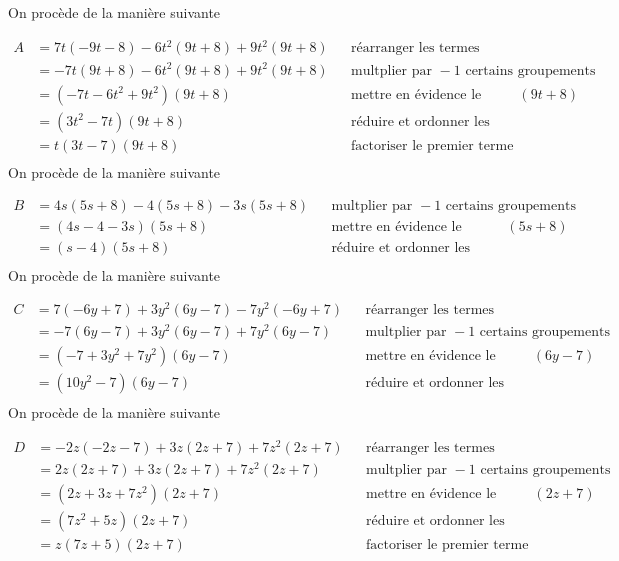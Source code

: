 \documentclass[a4paper,12pt]{report}
\begin{document}
\begin{core}\phantom{ }

\begin{tasks}
\task On procède de la manière suivante 

\medskip
 $\begin{aligned}A&=7 t(-9 t-8 )-6 t^2(9 t + 8 )+9 t^2(9 t + 8 )&&\text{réarranger les termes}\\&=-7 t(9 t + 8 )-6 t^2(9 t + 8 )+9 t^2(9 t + 8 )&&\text{multplier par } -1 \text{ certains groupements}\\&=(-7 t-6 t^2 + 9 t^2)(9 t + 8 )&& \text{mettre en évidence le facteur } (9 t + 8 )\\&=(3 t^2-7 t)(9 t + 8 ) && \text{réduire et ordonner les facteurs}\\&={{t(3 t-7 )(9 t + 8 )}}&& \text{factoriser le premier terme}\\\end{aligned}$
\task On procède de la manière suivante 

\medskip
 $\begin{aligned}B&=4 s(5 s + 8 )-4 (5 s + 8 )-3 s(5 s + 8 )&&\text{multplier par } -1 \text{ certains groupements}\\&=(4 s-4 -3 s)(5 s + 8 )&& \text{mettre en évidence le facteur } (5 s + 8 )\\&={{(s-4 )(5 s + 8 )}}&& \text{réduire et ordonner les facteurs}\\\end{aligned}$
\task On procède de la manière suivante 

\medskip
 $\begin{aligned}C&=7 (-6 y + 7 )+3 y^2(6 y-7 )-7 y^2(-6 y + 7 )&&\text{réarranger les termes}\\&=-7 (6 y-7 )+3 y^2(6 y-7 )+7 y^2(6 y-7 )&&\text{multplier par } -1 \text{ certains groupements}\\&=(-7  + 3 y^2 + 7 y^2)(6 y-7 )&& \text{mettre en évidence le facteur } (6 y-7 )\\&={{(10 y^2-7 )(6 y-7 )}}&& \text{réduire et ordonner les facteurs}\\\end{aligned}$
\task On procède de la manière suivante 

\medskip
 $\begin{aligned}D&=-2 z(-2 z-7 )+3 z(2 z + 7 )+7 z^2(2 z + 7 )&&\text{réarranger les termes}\\&=2 z(2 z + 7 )+3 z(2 z + 7 )+7 z^2(2 z + 7 )&&\text{multplier par } -1 \text{ certains groupements}\\&=(2 z + 3 z + 7 z^2)(2 z + 7 )&& \text{mettre en évidence le facteur } (2 z + 7 )\\&=(7 z^2 + 5 z)(2 z + 7 ) && \text{réduire et ordonner les facteurs}\\&={{z(7 z + 5 )(2 z + 7 )}}&& \text{factoriser le premier terme}\\\end{aligned}$
\end{tasks}

\end{core}
\end{document}
